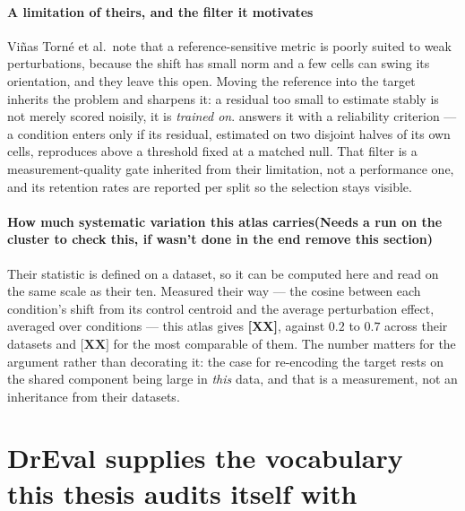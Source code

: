 \paragraph{A limitation of theirs, and the filter it motivates} Vi\~nas Torn\'e
et al.\ note that a reference-sensitive metric is poorly suited to weak
perturbations, because the shift has small norm and a few cells can swing its
orientation, and they leave this open. Moving the reference into the target
inherits the problem and sharpens it: a residual too small to estimate stably is
not merely scored noisily, it is \emph{trained on}. 
answers it with a reliability criterion --- a condition enters only if its
residual, estimated on two disjoint halves of its own cells, reproduces above a
threshold fixed at a matched null. That filter is a measurement-quality gate
inherited from their limitation, not a performance one, and its retention rates
are reported per split so the selection stays visible.

\paragraph{How much systematic variation this atlas carries(Needs a run on the cluster to check this, if wasn't done in the end remove this section)}
Their statistic is defined on a dataset, so it can be computed here and read on
the same scale as their ten. Measured their way --- the cosine between each
condition's shift from its control centroid and the average perturbation effect,
averaged over conditions --- this atlas gives \textbf{[XX]}, against $0.2$ to
$0.7$ across their datasets and $\textbf{[XX]}$ for the most comparable of them.
The number matters for the argument rather than decorating it: the case for
re-encoding the target rests on the shared component being large in \emph{this}
data, and that is a measurement, not an inheritance from their datasets.

\section{DrEval supplies the vocabulary this thesis audits itself with}
\label{sec:lit-dreval}
\framedecl{-}

